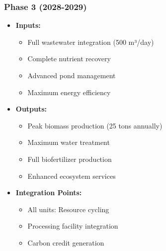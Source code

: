 \subsubsection{Phase 3 (2028-2029)}
\begin{itemize}
    \item \textbf{Inputs:}
    \begin{itemize}
        \item Full wastewater integration (500 m³/day)
        \item Complete nutrient recovery
        \item Advanced pond management
        \item Maximum energy efficiency
    \end{itemize}
    \item \textbf{Outputs:}
    \begin{itemize}
        \item Peak biomass production (25 tons annually)
        \item Maximum water treatment
        \item Full biofertilizer production
        \item Enhanced ecosystem services
    \end{itemize}
    \item \textbf{Integration Points:}
    \begin{itemize}
        \item All units: Resource cycling
        \item Processing facility integration
        \item Carbon credit generation
    \end{itemize}
\end{itemize}

